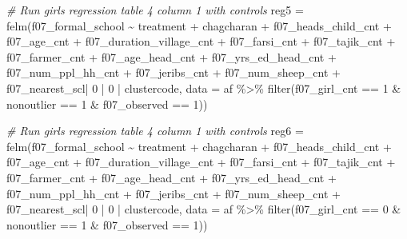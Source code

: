 \documentclass[
]{article}
\newenvironment{Shaded}{\begin{snugshade}}{\end{snugshade}}
\newcommand{\AttributeTok}[1]{\textcolor[rgb]{0.77,0.63,0.00}{#1}}
\newcommand{\CommentTok}[1]{\textcolor[rgb]{0.56,0.35,0.01}{\textit{#1}}}
\newcommand{\DecValTok}[1]{\textcolor[rgb]{0.00,0.00,0.81}{#1}}
\newcommand{\FunctionTok}[1]{\textcolor[rgb]{0.00,0.00,0.00}{#1}}
\newcommand{\NormalTok}[1]{#1}
\newcommand{\OtherTok}[1]{\textcolor[rgb]{0.56,0.35,0.01}{#1}}
\newcommand{\SpecialCharTok}[1]{\textcolor[rgb]{0.00,0.00,0.00}{#1}}
\begin{document}
\begin{Shaded}
\begin{Highlighting}[]
\CommentTok{\# Run girls regression table 4 column 1 with controls}
\NormalTok{reg5 }\OtherTok{=} \FunctionTok{felm}\NormalTok{(f07\_formal\_school }\SpecialCharTok{\textasciitilde{}}\NormalTok{ treatment }\SpecialCharTok{+}\NormalTok{ chagcharan }\SpecialCharTok{+}\NormalTok{ f07\_heads\_child\_cnt }\SpecialCharTok{+} 
\NormalTok{              f07\_age\_cnt }\SpecialCharTok{+}\NormalTok{ f07\_duration\_village\_cnt }\SpecialCharTok{+} 
\NormalTok{              f07\_farsi\_cnt }\SpecialCharTok{+}\NormalTok{ f07\_tajik\_cnt }\SpecialCharTok{+}\NormalTok{ f07\_farmer\_cnt }\SpecialCharTok{+} 
\NormalTok{              f07\_age\_head\_cnt }\SpecialCharTok{+}\NormalTok{ f07\_yrs\_ed\_head\_cnt }\SpecialCharTok{+}\NormalTok{ f07\_num\_ppl\_hh\_cnt }\SpecialCharTok{+} 
\NormalTok{              f07\_jeribs\_cnt }\SpecialCharTok{+}\NormalTok{ f07\_num\_sheep\_cnt }\SpecialCharTok{+} 
\NormalTok{              f07\_nearest\_scl}\SpecialCharTok{|} \DecValTok{0} \SpecialCharTok{|} \DecValTok{0} \SpecialCharTok{|}\NormalTok{ clustercode, }
            \AttributeTok{data =}\NormalTok{ af }\SpecialCharTok{\%\textgreater{}\%} \FunctionTok{filter}\NormalTok{(f07\_girl\_cnt }\SpecialCharTok{==} \DecValTok{1} \SpecialCharTok{\&} 
\NormalTok{                                 nonoutlier }\SpecialCharTok{==} \DecValTok{1} \SpecialCharTok{\&}
\NormalTok{                                 f07\_observed }\SpecialCharTok{==} \DecValTok{1}\NormalTok{))}

\CommentTok{\# Run girls regression table 4 column 1 with controls}
\NormalTok{reg6 }\OtherTok{=} \FunctionTok{felm}\NormalTok{(f07\_formal\_school }\SpecialCharTok{\textasciitilde{}}\NormalTok{ treatment }\SpecialCharTok{+}\NormalTok{ chagcharan }\SpecialCharTok{+}\NormalTok{ f07\_heads\_child\_cnt }\SpecialCharTok{+} 
\NormalTok{              f07\_age\_cnt }\SpecialCharTok{+}\NormalTok{ f07\_duration\_village\_cnt }\SpecialCharTok{+} 
\NormalTok{              f07\_farsi\_cnt }\SpecialCharTok{+}\NormalTok{ f07\_tajik\_cnt }\SpecialCharTok{+}\NormalTok{ f07\_farmer\_cnt }\SpecialCharTok{+} 
\NormalTok{              f07\_age\_head\_cnt }\SpecialCharTok{+}\NormalTok{ f07\_yrs\_ed\_head\_cnt }\SpecialCharTok{+}\NormalTok{ f07\_num\_ppl\_hh\_cnt }\SpecialCharTok{+} 
\NormalTok{              f07\_jeribs\_cnt }\SpecialCharTok{+}\NormalTok{ f07\_num\_sheep\_cnt }\SpecialCharTok{+} 
\NormalTok{              f07\_nearest\_scl}\SpecialCharTok{|} \DecValTok{0} \SpecialCharTok{|} \DecValTok{0} \SpecialCharTok{|}\NormalTok{ clustercode, }
            \AttributeTok{data =}\NormalTok{ af }\SpecialCharTok{\%\textgreater{}\%} \FunctionTok{filter}\NormalTok{(f07\_girl\_cnt }\SpecialCharTok{==} \DecValTok{0} \SpecialCharTok{\&} 
\NormalTok{                                 nonoutlier }\SpecialCharTok{==} \DecValTok{1} \SpecialCharTok{\&}
\NormalTok{                                 f07\_observed }\SpecialCharTok{==} \DecValTok{1}\NormalTok{))}
\end{Highlighting}
\end{Shaded}
\end{document}
